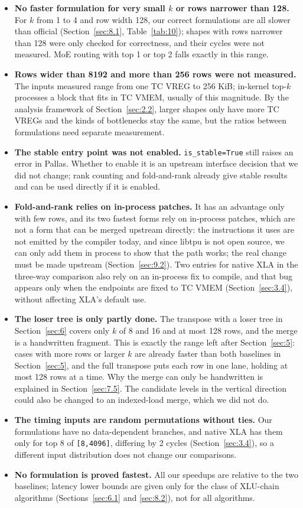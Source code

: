 \documentclass[sigconf,nonacm,balance=false]{acmart}
\newcommand{\code}[1]{\texttt{#1}}
\begin{document}
\begin{itemize}
\item \textbf{No faster formulation for very small $k$ or rows narrower than 128.} For $k$ from 1 to 4 and row width 128, our correct formulations are all slower than official (Section~\ref{sec:8.1}, Table~\ref{tab:10}); shapes with rows narrower than 128 were only checked for correctness, and their cycles were not measured. MoE routing with top 1 or top 2 falls exactly in this range.
\item \textbf{Rows wider than 8192 and more than 256 rows were not measured.} The inputs measured range from one TC VREG to 256 KiB; in-kernel top-$k$ processes a block that fits in TC VMEM, usually of this magnitude. By the analysis framework of Section~\ref{sec:2.2}, larger shapes only have more TC VREGs and the kinds of bottlenecks stay the same, but the ratios between formulations need separate measurement.
\item \textbf{The stable entry point was not enabled.} \code{is\_\allowbreak{}stable=\allowbreak{}True} still raises an error in Pallas. Whether to enable it is an upstream interface decision that we did not change; rank counting and fold-and-rank already give stable results and can be used directly if it is enabled.
\item \textbf{Fold-and-rank relies on in-process patches.} It has an advantage only with few rows, and its two fastest forms rely on in-process patches, which are not a form that can be merged upstream directly: the instructions it uses are not emitted by the compiler today, and since libtpu is not open source, we can only add them in process to show that the path works; the real change must be made upstream (Section~\ref{sec:9.2}). Two entries for native XLA in the three-way comparison also rely on an in-process fix to compile, and that bug appears only when the endpoints are fixed to TC VMEM (Section~\ref{sec:3.4}), without affecting XLA's default use.
\item \textbf{The loser tree is only partly done.} The transpose with a loser tree in Section~\ref{sec:6} covers only $k$ of 8 and 16 and at most 128 rows, and the merge is a handwritten fragment. This is exactly the range left after Section~\ref{sec:5}: cases with more rows or larger $k$ are already faster than both baselines in Section~\ref{sec:5}, and the full transpose puts each row in one lane, holding at most 128 rows at a time. Why the merge can only be handwritten is explained in Section~\ref{sec:7.5}. The candidate levels in the vertical direction could also be changed to an indexed-load merge, which we did not do.
\item \textbf{The timing inputs are random permutations without ties.} Our formulations have no data-dependent branches, and native XLA has them only for top 8 of \code{[8,\allowbreak{}4096]}, differing by 2 cycles (Section~\ref{sec:3.4}), so a different input distribution does not change our comparisons.
\item \textbf{No formulation is proved fastest.} All our speedups are relative to the two baselines; latency lower bounds are given only for the class of XLU-chain algorithms (Sections~\ref{sec:6.1} and \ref{sec:8.2}), not for all algorithms.
\end{itemize}
\end{document}
